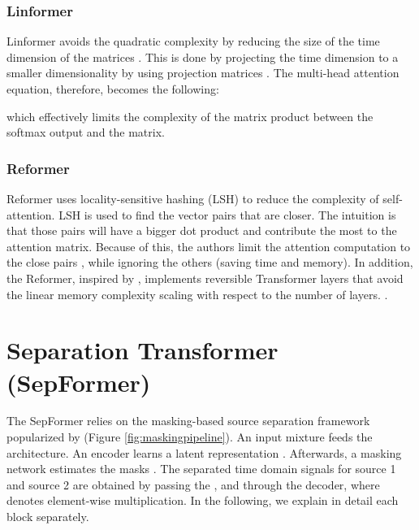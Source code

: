 \documentclass[lettersize,journal]{IEEEtran}
\begin{document}
\subsubsection{Linformer}
Linformer \cite{wang2020linformer} avoids the quadratic complexity by reducing the size of the time dimension of the matrices . This is done by projecting the time dimension  to a smaller dimensionality  by using projection matrices . The multi-head attention equation, therefore, becomes the following: 

which effectively limits the complexity of the matrix product between the softmax output and the  matrix. 

\subsubsection{Reformer}
Reformer \cite{kitaev2020reformer} uses locality-sensitive hashing (LSH) to reduce the complexity of self-attention. LSH is used to find the vector pairs  that are closer. The intuition is that those pairs will have a bigger dot product and contribute the most to the attention matrix. Because of this, the authors limit the attention computation to the close pairs , while ignoring the others (saving time and memory). In addition, the Reformer, inspired by \cite{DBLP:journals/corr/GomezRUG17}, implements reversible Transformer layers that avoid the linear memory complexity scaling with respect to the number of layers. .


\section{Separation Transformer (SepFormer)}
\label{sec:sepformer}



The SepFormer relies on the masking-based source separation framework popularized by \cite{luo2017tasnet, luo2018convtasnet} (Figure \ref{fig:maskingpipeline}). An input mixture  feeds the architecture. An encoder learns a latent representation . Afterwards, a masking network estimates the masks . The separated time domain signals for source 1 and source 2 are obtained by passing the , and  through the decoder, where  denotes element-wise multiplication. In the following, we explain in detail each block separately. 
\end{document}
